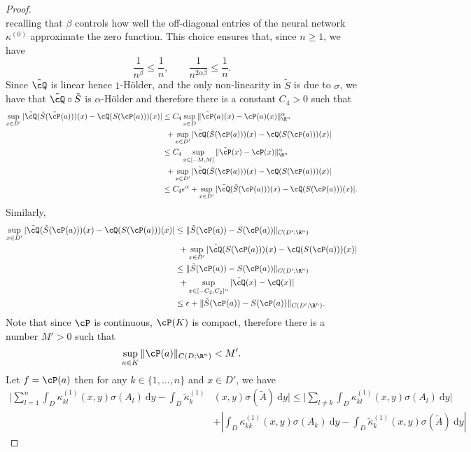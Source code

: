 {\begin{proof}
\[\]
recalling that \(\beta\) controls how well the off-diagonal entries of the neural network \(\kappa^{(0)}\) approximate the zero function. This choice ensures that, since \(n \geq 1\), we have 
\[\frac{1}{n^\beta} \leq \frac{1}{n}, \qquad \frac{1}{n^{2 \alpha \beta}} \leq \frac{1}{n}.\]
Since \(\tilde{\cQ}\) is linear hence \(1\)-H{\"o}lder, and the only non-linearity in \(\tilde{S}\) is due to \(\sigma\), we have that \(\tilde{\cQ} \circ \tilde{S}\) is \(\alpha\)-H{\"o}lder and therefore there is a constant \(C_4 > 0\) such that
\begin{align*}
    \sup_{x \in D'} |\tilde{\cQ}(\tilde{S}(\tilde{\cP}(a)))(x) - \cQ(S(\cP(a)))(x)| &\leq C_4 \sup_{x \in D} \|\tilde{\cP}(a)(x) - \cP(a)(x)\|_{\R^n}^\alpha  \\
    &\:\:+ \sup_{x \in D'} |\tilde{\cQ}(\tilde{S}(\cP(a)))(x) - \cQ(S(\cP(a)))(x)| \\
    &\leq C_4 \sup_{x \in [-M,M]} \|\tilde{\cP}(x) - \cP(x)\|_{\R^n}^\alpha  \\
    &\:\:+ \sup_{x \in D'} |\tilde{\cQ}(\tilde{S}(\cP(a)))(x) - \cQ(S(\cP(a)))(x)| \\
    &\leq C_4 \epsilon^\alpha + \sup_{x \in D'} |\tilde{\cQ}(\tilde{S}(\cP(a)))(x) - \cQ(S(\cP(a)))(x)|.
\end{align*}
Similarly,
\begin{align*}
    \sup_{x \in D'} |\tilde{\cQ}(\tilde{S}(\cP(a)))(x) - \cQ(S(\cP(a)))(x)| &\leq \|\tilde{S}(\cP(a)) - S(\cP(a))\|_{C(D';\R^n)} \\ 
    &\:\:+ \sup_{x \in D'} |\tilde{\cQ}(S(\cP(a)))(x) - \cQ(S(\cP(a)))(x)| \\
    & \leq \|\tilde{S}(\cP(a)) - S(\cP(a))\|_{C(D';\R^n)} \\ 
    &\:\:+ \sup_{x \in [-C_2, C_2]^n} |\tilde{\cQ}(x) - \cQ(x)| \\
    &\leq \epsilon + \|\tilde{S}(\cP(a)) - S(\cP(a))\|_{C(D';\R^n)}.
\end{align*}
Note that since \(\cP\) is continuous, \(\cP(K)\) is compact, therefore there is a number \(M' > 0\) such that
\[\sup_{a \in K} \|\cP(a)\|_{C(D;\R^n)} < M'.\]
Let \(f = \cP(a)\) then for any \(k \in \{1,\dots,n\}\) and \(x \in D'\), we have
\begin{align*}
    |\sum_{l=1}^n \int_D \kappa^{(1)}_{kl}(x,y) \sigma(A_l) \: \text{d}y - \int_D \tilde{\kappa}^{(1)}_k &(x,y)\sigma(\tilde{A}) \: \text{d}y| \leq |\sum_{l \neq k} \int_D \kappa^{(1)}_{kl}(x,y) \sigma(A_l) \: \text{d}y| \\
    &+ |\int_D \kappa^{(1)}_{kk}(x,y) \sigma(A_k) \: \text{d}y - \int_D \tilde{\kappa}^{(1)}_k(x,y) \sigma(\tilde{A}) \: \text{d}y|

\end{align*}
\end{proof}}
